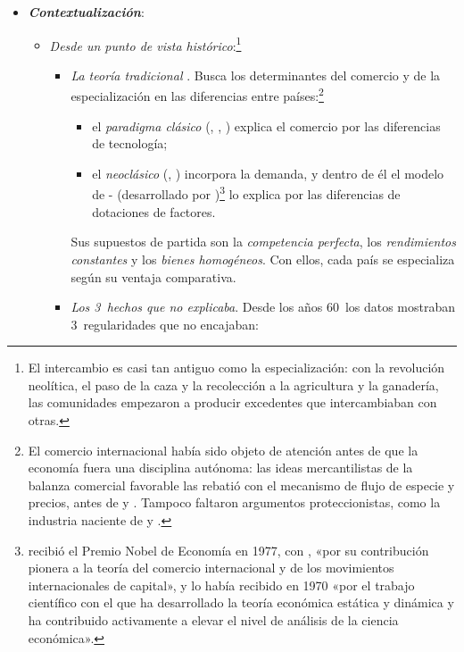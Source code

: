\documentclass[11pt]{article}
\begin{document}
\begin{itemize}
\item \textbf{\emph{Contextualización}}:
  \begin{itemize}
  \item \emph{Desde un punto de vista histórico}:\footnote{El intercambio es casi tan antiguo como la especialización: con la revolución neolítica, el paso de la caza y la recolección a la agricultura y la ganadería, las comunidades empezaron a producir excedentes que intercambiaban con otras.}
  \begin{itemize}
  \item \emph{La teoría tradicional} . Busca los determinantes del comercio y de la especialización en las diferencias entre países:\footnote{El comercio internacional había sido objeto de atención antes de que la economía fuera una disciplina autónoma: las ideas mercantilistas de la balanza comercial favorable las rebatió \textcite{Hume1752Balance} con el mecanismo de flujo de especie y precios, antes de  y . Tampoco faltaron argumentos proteccionistas, como la industria naciente de \textcite{Hamilton1791Report} y \textcite{List1841System} .}
    \begin{itemize}
    \item el \emph{paradigma clásico} (, , ) explica el comercio por las diferencias de tecnología;
    \item el \emph{neoclásico} (, ) incorpora la demanda, y dentro de él el modelo de - (desarrollado por )\footnote{ recibió el Premio Nobel de Economía en 1977, con , «por su contribución pionera a la teoría del comercio internacional y de los movimientos internacionales de capital»\nocite{Nobel1977MeadeOhlin}, y  lo había recibido en 1970 «por el trabajo científico con el que ha desarrollado la teoría económica estática y dinámica y ha contribuido activamente a elevar el nivel de análisis de la ciencia económica»\nocite{Nobel1970Samuelson}.} lo explica por las diferencias de dotaciones de factores.
    \end{itemize}
    Sus supuestos de partida son la \emph{competencia perfecta}, los \emph{rendimientos constantes} y los \emph{bienes homogéneos}. Con ellos, cada país se especializa según su ventaja comparativa.
  \item \emph{Los 3~hechos que no explicaba}. Desde los años 60~los datos mostraban 3~regularidades que no encajaban:

\end{itemize}
\end{itemize}
\end{itemize}
\end{document}
